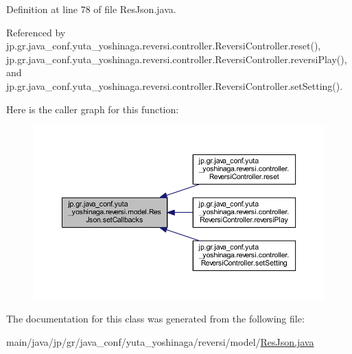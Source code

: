 Definition at line 78 of file Res\+Json.\+java.



Referenced by jp.\+gr.\+java\+\_\+conf.\+yuta\+\_\+yoshinaga.\+reversi.\+controller.\+Reversi\+Controller.\+reset(), jp.\+gr.\+java\+\_\+conf.\+yuta\+\_\+yoshinaga.\+reversi.\+controller.\+Reversi\+Controller.\+reversi\+Play(), and jp.\+gr.\+java\+\_\+conf.\+yuta\+\_\+yoshinaga.\+reversi.\+controller.\+Reversi\+Controller.\+set\+Setting().

Here is the caller graph for this function\+:
\nopagebreak
\begin{figure}[H]
\begin{center}
\leavevmode
\includegraphics[width=350pt]{classjp_1_1gr_1_1java__conf_1_1yuta__yoshinaga_1_1reversi_1_1model_1_1_res_json_a2c93a1f6a03a04909da59238c7e68ca3_icgraph}
\end{center}
\end{figure}


The documentation for this class was generated from the following file\+:\begin{DoxyCompactItemize}
\item 
main/java/jp/gr/java\+\_\+conf/yuta\+\_\+yoshinaga/reversi/model/\hyperlink{_res_json_8java}{Res\+Json.\+java}\end{DoxyCompactItemize}
